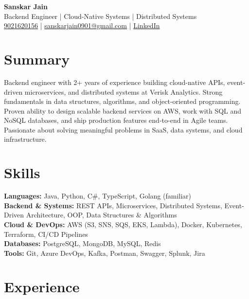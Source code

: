 \documentclass[a4paper,10pt]{article}
\begin{document}
\begin{center}
    {\LARGE \textbf{Sanskar Jain}} \\
    Backend Engineer | Cloud-Native Systems | Distributed Systems \\
    \href{tel:9021620156}{9021620156} \;|\;
    \href{mailto:sanskarjain0901@gmail.com}{sanskarjain0901@gmail.com} \;|\;
    \href{https://www.linkedin.com/in/sanskar-jain0901/}{LinkedIn}
\end{center}

\vspace{3pt}

\section*{Summary}
Backend engineer with 2+ years of experience building cloud-native APIs, event-driven microservices, and distributed systems at Verisk Analytics. Strong fundamentals in data structures, algorithms, and object-oriented programming. Proven ability to design scalable backend services on AWS, work with SQL and NoSQL databases, and ship production features end-to-end in Agile teams. Passionate about solving meaningful problems in SaaS, data systems, and cloud infrastructure.

\section*{Skills}
\textbf{Languages:} Java, Python, C\#, TypeScript, Golang (familiar) \\
\textbf{Backend \& Systems:} REST APIs, Microservices, Distributed Systems, Event-Driven Architecture, OOP, Data Structures \& Algorithms \\
\textbf{Cloud \& DevOps:} AWS (S3, SNS, SQS, EKS, Lambda), Docker, Kubernetes, Terraform, CI/CD Pipelines \\
\textbf{Databases:} PostgreSQL, MongoDB, MySQL, Redis \\
\textbf{Tools:} Git, Azure DevOps, Kafka, Postman, Swagger, Splunk, Jira

\section*{Experience}
\end{document}
